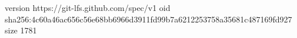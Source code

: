 version https://git-lfs.github.com/spec/v1
oid sha256:4c60a46ac656c56e68bb6966d3911fd99b7a6212253758a35681c487169fd927
size 1781
